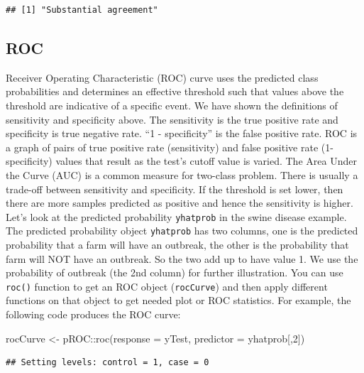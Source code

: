 \documentclass[
  12pt,
]{krantz}
\makeatletter
\newenvironment{Shaded}{\begin{snugshade}}{\end{snugshade}}
\newcommand{\AttributeTok}[1]{\textcolor[rgb]{0.61,0.61,0.61}{#1}}
\newcommand{\DecValTok}[1]{\textcolor[rgb]{0.06,0.06,0.06}{#1}}
\newcommand{\FunctionTok}[1]{\textcolor[rgb]{0,0,0}{#1}}
\newcommand{\NormalTok}[1]{#1}
\newcommand{\OtherTok}[1]{\textcolor[rgb]{0.37,0.37,0.37}{#1}}
\newcommand{\SpecialCharTok}[1]{\textcolor[rgb]{0,0,0}{#1}}
\newenvironment{kframe}{%
\medskip{}
\setlength{\fboxsep}{.8em}
 \def\at@end@of@kframe{}%
 \ifinner\ifhmode%
  \def\at@end@of@kframe{\end{minipage}}%
  \begin{minipage}{\columnwidth}%
 \fi\fi%
 \def\FrameCommand##1{\hskip\@totalleftmargin \hskip-\fboxsep
 \colorbox{shadecolor}{##1}\hskip-\fboxsep
     \hskip-\linewidth \hskip-\@totalleftmargin \hskip\columnwidth}%
 \MakeFramed {\advance\hsize-\width
   \@totalleftmargin\z@ \linewidth\hsize
   \@setminipage}}%
 {\par\unskip\endMakeFramed%
 \at@end@of@kframe}
\renewenvironment{Shaded}{\begin{kframe}}{\end{kframe}}
\makeatother
\begin{document}
\begin{verbatim}
## [1] "Substantial agreement"
\end{verbatim}

\hypertarget{roc}{%
\subsection{ROC}\label{roc}}

Receiver Operating Characteristic (ROC) curve uses the predicted class probabilities and determines an effective threshold such that values above the threshold are indicative of a specific event. We have shown the definitions of sensitivity and specificity above. The sensitivity is the true positive rate and specificity is true negative rate. ``1 - specificity'' is the false positive rate. ROC is a graph of pairs of true positive rate (sensitivity) and false positive rate (1-specificity) values that result as the test's cutoff value is varied. The Area Under the Curve (AUC) is a common measure for two-class problem. There is usually a trade-off between sensitivity and specificity. If the threshold is set lower, then there are more samples predicted as positive and hence the sensitivity is higher. Let's look at the predicted probability \texttt{yhatprob} in the swine disease example. The predicted probability object \texttt{yhatprob} has two columns, one is the predicted probability that a farm will have an outbreak, the other is the probability that farm will NOT have an outbreak. So the two add up to have value 1. We use the probability of outbreak (the 2nd column) for further illustration. You can use \texttt{roc()} function to get an ROC object (\texttt{rocCurve}) and then apply different functions on that object to get needed plot or ROC statistics. For example, the following code produces the ROC curve:

\begin{Shaded}
\begin{Highlighting}[]
\NormalTok{rocCurve }\OtherTok{\textless{}{-}}\NormalTok{ pROC}\SpecialCharTok{::}\FunctionTok{roc}\NormalTok{(}\AttributeTok{response =}\NormalTok{ yTest,}
              \AttributeTok{predictor =}\NormalTok{ yhatprob[,}\DecValTok{2}\NormalTok{])}
\end{Highlighting}
\end{Shaded}

\begin{verbatim}
## Setting levels: control = 1, case = 0
\end{verbatim}
\end{document}
